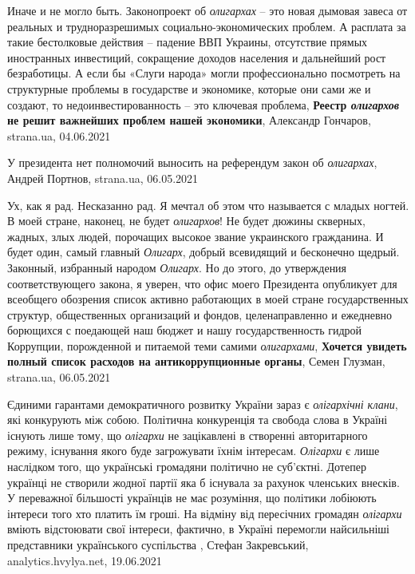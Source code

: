 Иначе и не могло быть. Законопроект об \emph{олигархах} – это новая дымовая
завеса от реальных и трудноразрешимых социально-экономических проблем. А
расплата за такие бестолковые действия – падение ВВП Украины, отсутствие прямых
иностранных инвестиций, сокращение доходов населения и дальнейший рост
безработицы. А если бы «Слуги народа» могли профессионально посмотреть на
структурные проблемы в государстве и экономике, которые они сами же и создают,
то недоинвестированность – это ключевая проблема,
\textbf{Реестр \emph{олигархов} не решит важнейших проблем нашей экономики},
Александр Гончаров, strana.ua, 04.06.2021

У президента нет полномочий выносить на референдум закон об \emph{олигархах},
Андрей Портнов, strana.ua, 06.05.2021

Ух, как я рад. Несказанно рад. Я мечтал об этом что называется с младых ногтей.
В моей стране, наконец, не будет \emph{олигархов}! Не будет дюжины скверных, жадных,
злых людей, порочащих высокое звание украинского гражданина. И будет один,
самый главный \emph{Олигарх}, добрый всевидящий и бесконечно щедрый. Законный,
избранный народом \emph{Олигарх}.  Но до этого, до утверждения соответствующего
закона, я уверен, что офис моего Президента опубликует для всеобщего обозрения
список активно работающих в моей стране государственных структур, общественных
организаций и фондов, целенаправленно и ежедневно борющихся с поедающей наш
бюджет и нашу государственность гидрой Коррупции, порожденной и питаемой теми
самими \emph{олигархами},
\textbf{Хочется увидеть полный список расходов на антикоррупционные органы},
Семен Глузман, strana.ua, 06.05.2021


Єдиними гарантами демократичного розвитку України зараз є \emph{олігархічні клани},
які конкурують між собою. Політична конкуренція та свобода слова в Україні
існують лише тому, що \emph{олігархи} не зацікавлені в створенні авторитарного
режиму, існування якого буде загрожувати їхнім інтересам. \emph{Олігархи} є лише
наслідком того, що українські громадяни політично не суб’єктні. Дотепер
українці не створили жодної партії яка б існувала за рахунок членських
внесків. У переважної більшості українців не має розуміння, що політики
лобіюють інтереси того хто платить їм гроші. На відміну від пересічних
громадян \emph{олігархи} вміють відстоювати свої інтереси, фактично, в Україні
перемогли найсильніші представники українського суспільства
, Стефан Закревський, 
analytics.hvylya.net, 19.06.2021

